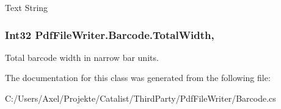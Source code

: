 Text String 

\subsubsection[{\texorpdfstring{Total\+Width}{TotalWidth}}]{\setlength{\rightskip}{0pt plus 5cm}Int32 Pdf\+File\+Writer.\+Barcode.\+Total\+Width\hspace{0.3cm}{\ttfamily [get]}, {}}\hypertarget{class_pdf_file_writer_1_1_barcode_a7390066c4c5a6d1dc8e0fd93c9eb8214}{}\label{class_pdf_file_writer_1_1_barcode_a7390066c4c5a6d1dc8e0fd93c9eb8214}


Total barcode width in narrow bar units. 



The documentation for this class was generated from the following file\+:\begin{DoxyCompactItemize}
\item 
C\+:/\+Users/\+Axel/\+Projekte/\+Catalist/\+Third\+Party/\+Pdf\+File\+Writer/Barcode.\+cs\end{DoxyCompactItemize}
